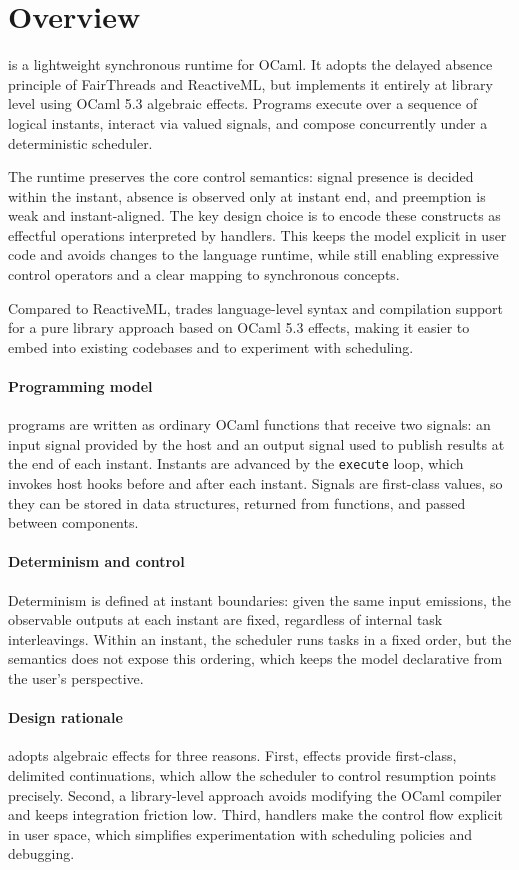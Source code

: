 \section{\tempo{} Overview}
\tempo{} is a lightweight synchronous runtime for OCaml. It adopts the delayed
absence principle of FairThreads and ReactiveML, but implements it entirely at
library level using OCaml 5.3 algebraic effects. Programs execute over a
sequence of logical instants, interact via valued signals, and compose
concurrently under a deterministic scheduler.

The runtime preserves the core control semantics: signal presence is decided
within the instant, absence is observed only at instant end, and preemption is
weak and instant-aligned. The key design choice is to encode these constructs
as effectful operations interpreted by handlers. This keeps the model explicit
in user code and avoids changes to the language runtime, while still enabling
expressive control operators and a clear mapping to synchronous concepts.

Compared to ReactiveML, \tempo{} trades language-level syntax and compilation
support for a pure library approach based on OCaml 5.3 effects, making it
easier to embed into existing codebases and to experiment with scheduling.

\paragraph{Programming model}
\tempo{} programs are written as ordinary OCaml functions that receive two
signals: an input signal provided by the host and an output signal used to
publish results at the end of each instant. Instants are advanced by the
\texttt{execute} loop, which invokes host hooks before and after each instant.
Signals are first-class values, so they can be stored in data structures,
returned from functions, and passed between components.

\paragraph{Determinism and control}
Determinism is defined at instant boundaries: given the same input emissions,
the observable outputs at each instant are fixed, regardless of internal task
interleavings. Within an instant, the scheduler runs tasks in a fixed order,
but the semantics does not expose this ordering, which keeps the model
declarative from the user's perspective.

\paragraph{Design rationale}
\tempo{} adopts algebraic effects for three reasons. First, effects provide
first-class, delimited continuations, which allow the scheduler to control
resumption points precisely. Second, a library-level approach avoids modifying
the OCaml compiler and keeps integration friction low. Third, handlers make the
control flow explicit in user space, which simplifies experimentation with
scheduling policies and debugging.

